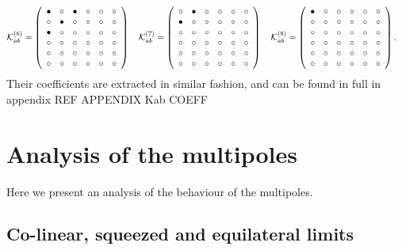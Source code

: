 \begin{align}
\\ \mathcal{K}^{(6)}_{ab}&= 
 \left( \begin {array}{cccccc} \bullet &\circ &\bullet &\circ 
&\circ &\circ \\  \circ &\bullet &\circ &
\circ &\circ &\circ \\  \bullet &\circ &
\circ &\circ &\circ &\circ \\  \circ &
\circ &\circ &\circ &\circ &\circ \\  
\circ &\circ &\circ &\circ &\circ &\circ 
\\  \circ &\circ &\circ &\circ &\circ &
\circ \end {array} \right) 
~~~ \mathcal{K}^{(7)}_{ab}= 
 \left( \begin {array}{cccccc} \circ &\bullet &\circ &\circ &
\circ &\circ \\  \bullet &\circ &\circ &
\circ &\circ &\circ \\  \circ &\circ &
\circ &\circ &\circ &\circ \\  \circ &
\circ &\circ &\circ &\circ &\circ \\  
\circ &\circ &\circ &\circ &\circ &\circ 
\\  \circ &\circ &\circ &\circ &\circ &
\circ \end {array} \right) 
~~~ \mathcal{K}^{(8)}_{ab}= 
 \left( \begin {array}{cccccc} \bullet &\circ &\circ &\circ &
\circ &\circ \\  \circ &\circ &\circ &
\circ &\circ &\circ \\  \circ &\circ &
\circ &\circ &\circ &\circ \\  \circ &
\circ &\circ &\circ &\circ &\circ \\  
\circ &\circ &\circ &\circ &\circ &\circ 
\\  \circ &\circ &\circ &\circ &\circ &
\circ \end {array} \right).
\end{align}
Their coefficients are extracted in similar fashion, and can be found in full in appendix  REF APPENDIX Kab COEFF%



\section{Analysis of the multipoles}\label{sec:anal}

Here we present an analysis of the behaviour of the  multipoles. 

\subsection{ Co-linear, squeezed and equilateral limits}


